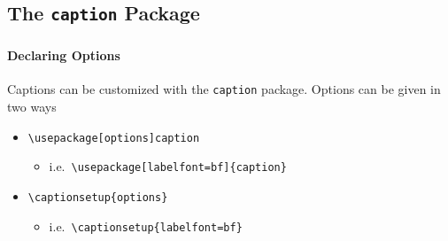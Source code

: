 \documentclass[article]{beamer}
\begin{document}
\subsection{The \texttt{caption} Package}
\begin{frame}
  \frametitle{\thesubsection}
  \framesubtitle{Declaring Options}
  Captions can be customized with the \texttt{caption} package.  Options can
  be given in two ways
  \begin{itemize}%
    \item \texttt{\textbackslash usepackage[options]caption}
      \begin{itemize}%
        \item i.e.~\texttt{\textbackslash usepackage[labelfont=bf]\{caption\}}
      \end{itemize}
    \item \texttt{\textbackslash captionsetup\{options\}}
      \begin{itemize}%
        \item i.e.~\texttt{\textbackslash captionsetup\{labelfont=bf\}}
      \end{itemize}
  \end{itemize}
  
\end{frame}
\end{document}
